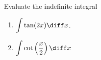 Evaluate the indefinite integral 
\begin{enumerate}
\item $\displaystyle\int \tan (2x) \diff x$.
\item $\displaystyle \int \cot \left(\frac{x}{2}\right) \diff x$
\end{enumerate}
